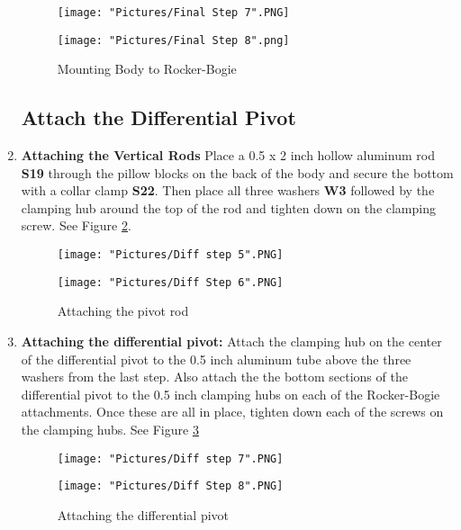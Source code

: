 \documentclass[12pt]{article}
\begin{document}
\begin{enumerate}
\begin{figure}[H]
  \centering
  \begin{minipage}[b]{0.45\textwidth}
    \texttt{[image: "Pictures/Final Step 7".PNG]}
  \end{minipage}
  \hfill
  \begin{minipage}[b]{0.45\textwidth}
    \texttt{[image: "Pictures/Final Step 8".png]}
  \end{minipage}
  \caption{Mounting Body to Rocker-Bogie}
  \label{body to rb}
\end{figure}


\subsection{Attach the Differential Pivot}

\item \textbf{Attaching the Vertical Rods} Place a 0.5 x 2 inch hollow aluminum rod \textbf{S19} through the pillow blocks on the back of the body and secure the bottom with a collar clamp \textbf{S22}. Then place all three washers 
\textbf{W3} followed by the clamping hub around the top of the rod and tighten down on the clamping screw. See Figure \ref{attaching pivot rod}.

\begin{figure}[H]
  	\centering
  	\begin{minipage}[b]{0.35\textwidth}
   		\texttt{[image: "Pictures/Diff step 5".PNG]}
  	\end{minipage}
  	\hfill
  	\begin{minipage}[b]{0.35\textwidth}
    		\texttt{[image: "Pictures/Diff Step 6".PNG]}
  	\end{minipage}
  	\caption{Attaching the pivot rod}
  	\label{attaching pivot rod}
\end{figure}

	\item \textbf{Attaching the differential pivot:} Attach the clamping hub on the center of the differential pivot to the 0.5 inch aluminum tube above the three washers from the last step. Also attach the the bottom sections of the differential pivot to the 0.5 inch clamping hubs on each of the Rocker-Bogie attachments. Once these are all in place, tighten down each of the screws on the clamping hubs.  See Figure \ref{attaching diff pvt}

\begin{figure}[H]
  	\centering
  	\begin{minipage}[b]{0.35\textwidth}
   		\texttt{[image: "Pictures/Diff step 7".PNG]}
  	\end{minipage}
  	\hfill
  	\begin{minipage}[b]{0.35\textwidth}
    		\texttt{[image: "Pictures/Diff Step 8".PNG]}
  	\end{minipage}
  	\caption{Attaching the differential pivot}
  	\label{attaching diff pvt}
\end{figure}


\end{enumerate}
\end{document}
